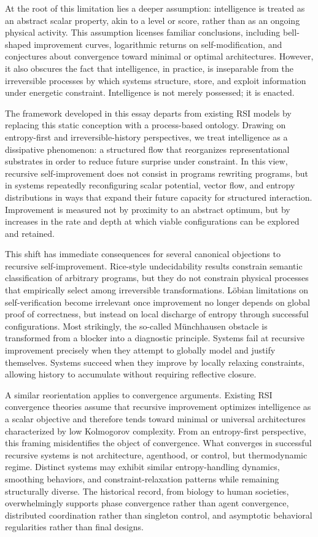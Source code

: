 \documentclass[11pt]{article}
\begin{document}
At the root of this limitation lies a deeper assumption: intelligence is treated as an abstract scalar property, akin to a level or score, rather than as an ongoing physical activity. This assumption licenses familiar conclusions, including bell-shaped improvement curves, logarithmic returns on self-modification, and conjectures about convergence toward minimal or optimal architectures. However, it also obscures the fact that intelligence, in practice, is inseparable from the irreversible processes by which systems structure, store, and exploit information under energetic constraint. Intelligence is not merely possessed; it is enacted.

The framework developed in this essay departs from existing RSI models by replacing this static conception with a process-based ontology. Drawing on entropy-first and irreversible-history perspectives, we treat intelligence as a dissipative phenomenon: a structured flow that reorganizes representational substrates in order to reduce future surprise under constraint. In this view, recursive self-improvement does not consist in programs rewriting programs, but in systems repeatedly reconfiguring scalar potential, vector flow, and entropy distributions in ways that expand their future capacity for structured interaction. Improvement is measured not by proximity to an abstract optimum, but by increases in the rate and depth at which viable configurations can be explored and retained.

This shift has immediate consequences for several canonical objections to recursive self-improvement. Rice-style undecidability results constrain semantic classification of arbitrary programs, but they do not constrain physical processes that empirically select among irreversible transformations. Löbian limitations on self-verification become irrelevant once improvement no longer depends on global proof of correctness, but instead on local discharge of entropy through successful configurations. Most strikingly, the so-called Münchhausen obstacle is transformed from a blocker into a diagnostic principle. Systems fail at recursive improvement precisely when they attempt to globally model and justify themselves. Systems succeed when they improve by locally relaxing constraints, allowing history to accumulate without requiring reflective closure.

A similar reorientation applies to convergence arguments. Existing RSI convergence theories assume that recursive improvement optimizes intelligence as a scalar objective and therefore tends toward minimal or universal architectures characterized by low Kolmogorov complexity. From an entropy-first perspective, this framing misidentifies the object of convergence. What converges in successful recursive systems is not architecture, agenthood, or control, but thermodynamic regime. Distinct systems may exhibit similar entropy-handling dynamics, smoothing behaviors, and constraint-relaxation patterns while remaining structurally diverse. The historical record, from biology to human societies, overwhelmingly supports phase convergence rather than agent convergence, distributed coordination rather than singleton control, and asymptotic behavioral regularities rather than final designs.
\end{document}

